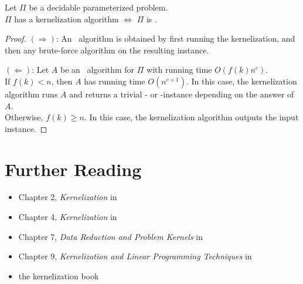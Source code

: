 \begin{frame}

	\begin{theorem}
		Let $\Pi$ be a decidable parameterized problem.\\
		$\Pi$ has a kernelization algorithm $\Leftrightarrow$ $\Pi$ is \FPT.
	\end{theorem}
	\pause
	\begin{proof}
		$(\Rightarrow)$: An \FPT\ algorithm is obtained by first running the kernelization, and then any brute-force algorithm on the resulting instance.

		$(\Leftarrow)$: Let $A$ be an \FPT\ algorithm for $\Pi$ with running time $O(f(k) n^c)$.\\
		If $f(k)<n$, then $A$ has running time $O(n^{c+1})$. In this case, the kernelization algorithm runs $A$ and returns a trivial \Yes- or \No-instance depending on the answer of $A$.\\
		Otherwise, $f(k)\ge n$. In this case, the kernelization algorithm outputs the input instance.
	\end{proof}

\end{frame}



\section{Further Reading}

\begin{frame}

	\begin{itemize}
		\item Chapter 2, \emph{Kernelization} in \cite{CyganFKL+15}
		\item Chapter 4, \emph{Kernelization} in \cite{DowneyF13}
		\item Chapter 7, \emph{Data Reduction and Problem Kernels} in \cite{Niedermeier06}
		\item Chapter 9, \emph{Kernelization and Linear Programming Techniques} in \cite{FlumG06}
		\item the kernelization book \cite{FominLSZ19}
	\end{itemize}

\end{frame}


\begin{frame}[t]
	\printbibliography
\end{frame}


